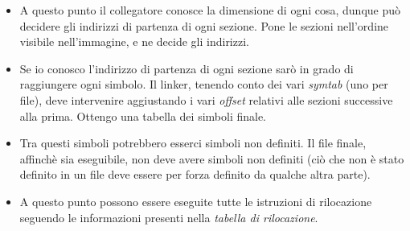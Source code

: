 \begin{itemize}
	\item A questo punto il collegatore conosce la dimensione di ogni cosa, dunque può decidere gli indirizzi di partenza di ogni sezione. Pone le sezioni nell'ordine visibile nell'immagine, e ne decide gli indirizzi. 
	\item Se io conosco l'indirizzo di partenza di ogni sezione sarò in grado di raggiungere ogni simbolo.  Il linker, tenendo conto dei vari \emph{symtab} (uno per file), deve intervenire aggiustando i vari \emph{offset} relativi alle sezioni successive alla prima. Ottengo una tabella dei simboli finale.
	\item Tra questi simboli potrebbero esserci simboli non definiti. Il file finale, affinchè sia eseguibile, non deve avere simboli non definiti (ciò che non è stato definito in un file deve essere per forza definito da qualche altra parte).
	\item A questo punto possono essere eseguite tutte le istruzioni di rilocazione seguendo le informazioni presenti nella \emph{tabella di rilocazione}.
\end{itemize}
